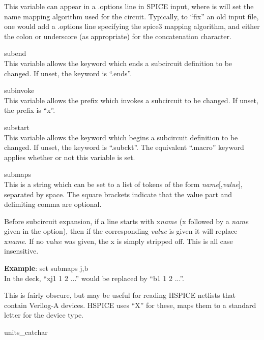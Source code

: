 \begin{description}
This variable can appear in a {\vt .options} line in SPICE input,
where is will set the name mapping algorithm used for the circuit. 
Typically, to ``fix'' an old input file, one would add a {\vt
.options} line specifying the {\vt spice3} mapping algorithm, and
either the colon or underscore (as appropriate) for the concatenation
character.

\item{\et subend}\\
This variable allows the keyword which ends a subcircuit definition
to be changed.  If unset, the keyword is ``{\vt .ends}''.

\item{\et subinvoke}\\
This variable allows the prefix which invokes a subcircuit to be
changed.  If unset, the prefix is ``{\vt x}''.

\item{\et substart}\\
This variable allows the keyword which begins a subcircuit definition
to be changed.  If unset, the keyword is ``{\vt .subckt}''.  The
equivalent ``{\vt .macro}'' keyword applies whether or not this
variable is set.

\item{\et submaps}\\
This is a string which can be set to a list of tokens of the form {\it
name\/}[{\vt ,}{\it value\/}], separated by space.  The square
brackets indicate that the value part and delimiting comma are
optional.

Before subcircuit expansion, if a line starts with {\vt x}{\it name}
({\vt x} followed by a {\it name} given in the option), then if the
corresponding {\it value} is given it will replace {\vt x}{\it name}. 
If no {\it value} was given, the {\vt x} is simply stripped off.  This
is all case insensitive.

{\bf Example}:  {\vt set submaps j,b}\\
In the deck, ``{\vt xj1 1 2 ...}'' would be replaced by ``{\vt b1 1 2
...}''.

This is fairly obscure, but may be useful for reading HSPICE netlists
that contain Verilog-A devices.  HSPICE uses ``{\vt X}'' for these,
{\WRspice} maps them to a standard letter for the device type.

\item{\et units\_catchar}\\


\end{description}
